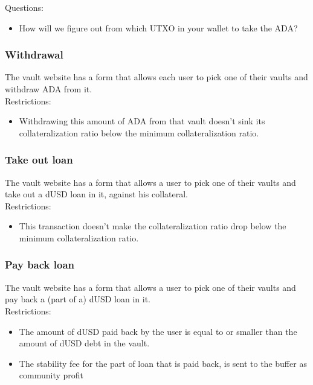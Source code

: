 \documentclass{article} %
\begin{document}
Questions:
\begin{itemize}
  \item How will we figure out from which UTXO in your wallet to take the ADA?
\end{itemize}

\subsubsection{Withdrawal}

The vault website has a form that allows each user to pick one of their vaults
and withdraw ADA from it. \\

Restrictions:
\begin{itemize}
  \item Withdrawing this amount of ADA from that vault doesn't sink its
    collateralization ratio below the minimum collateralization ratio.
\end{itemize}

\subsubsection{Take out loan}

The vault website has a form that allows a user to pick one of their vaults and
take out a dUSD loan in it, against his collateral. \\

Restrictions:
\begin{itemize}
  \item This transaction doesn't make the collateralization ratio drop below the
    minimum collateralization ratio.
\end{itemize}


\subsubsection{Pay back loan}

The vault website has a form that allows a user to pick one of their vaults and
pay back a (part of a) dUSD loan in it. \\

Restrictions:
\begin{itemize}
  \item The amount of dUSD paid back by the user is equal to or smaller than the
    amount of dUSD debt in the vault.
  \item The stability fee for the part of loan that is paid back, is sent to the
    buffer as community profit
\end{itemize}
\end{document}
